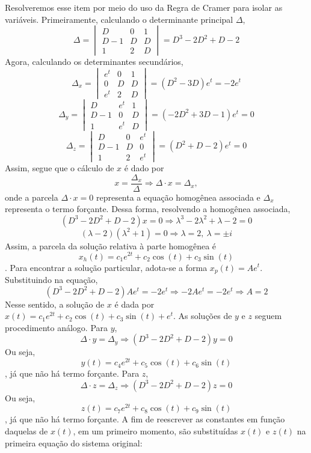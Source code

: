 \documentclass[oneside,12pt,a4paper]{report}
\begin{document}
\begin{resolucao}
        \itemresolucao Resolveremos esse item por meio do uso da Regra de Cramer para isolar as variáveis. Primeiramente, calculando o determinante principal $\Delta$, 
        \[\Delta=\begin{vmatrix}
            D & 0 & 1\\
            D-1 & D & D\\
            1 & 2 & D
        \end{vmatrix}=D^3-2D^2+D-2\]
        Agora, calculando os determinantes secundários,
        \[\Delta_x=\begin{vmatrix}
            e^t & 0 & 1\\
            0 & D & D\\
            e^t & 2 & D
        \end{vmatrix}=(D^2-3D)e^t=-2e^t\]
        \[\Delta_y=\begin{vmatrix}
            D & e^t & 1\\
            D-1 & 0 & D\\
            1 & e^t & D
        \end{vmatrix}=(-2D^2+3D-1)e^t=0\]
        \[\Delta_z=\begin{vmatrix}
            D & 0 & e^t\\
            D-1 & D & 0\\
            1 & 2 & e^t
        \end{vmatrix}=(D^2+D-2)e^t=0\]
        Assim, segue que o cálculo de $x$ é dado por
        \[x=\frac{\Delta_x}{\Delta}\Rightarrow\Delta\cdot x=\Delta_x,\]
        onde a parcela $\Delta\cdot x=0$ representa a equação homogênea associada e $\Delta_x$ representa o termo forçante. Dessa forma, resolvendo a homogênea associada,
        \[(D^3-2D^2+D-2)x=0\Rightarrow\lambda^3-2\lambda^2+\lambda-2=0\]
        \[(\lambda-2)(\lambda^2+1)=0\Rightarrow\lambda=2,~\lambda=\pm i\]
        Assim, a parcela da solução relativa à parte homogênea é \[x_h(t)=c_1e^{2t}+c_2\cos(t)+c_3\sin(t)\]. Para encontrar a solução particular, adota-se a forma $x_p(t)=Ae^t$. Substituindo na equação,
        \[(D^3-2D^2+D-2)Ae^t=-2e^t\Rightarrow-2Ae^t=-2e^t\Rightarrow A=2\]
        Nesse sentido, a solução de $x$ é dada por $x(t)=c_1e^{2t}+c_2\cos(t)+c_3\sin(t)+e^t$. As soluções de $y$ e $z$ seguem procedimento análogo. Para $y$,
        \[\Delta\cdot y=\Delta_y\Rightarrow(D^3-2D^2+D-2)y=0\]
        Ou seja, \[y(t)=c_4e^{2t}+c_5\cos(t)+c_6\sin(t)\], já que não há termo forçante. Para $z$,
        \[\Delta\cdot z=\Delta_z\Rightarrow(D^3-2D^2+D-2)z=0\]
        Ou seja, \[z(t)=c_7e^{2t}+c_8\cos(t)+c_9\sin(t)\], já que não há termo forçante. A fim de reescrever as constantes em função daquelas de $x(t)$, em um primeiro momento, são substituídas $x(t)$ e $z(t)$ na primeira equação do sistema original:

\end{resolucao}
\end{document}

